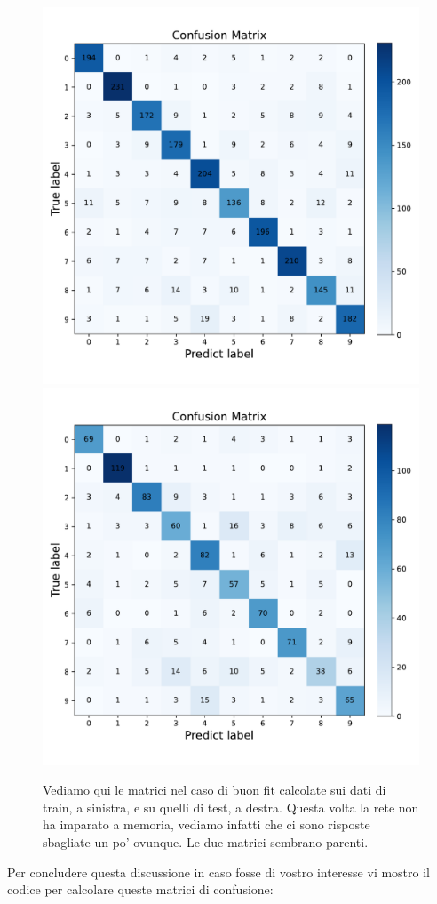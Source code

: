 \documentclass[10pt,a4paper]{article}
\begin{document}
\FloatBarrier
\FloatBarrier
\begin{figure}[h]
\centering
\includegraphics[scale=0.4]{img/conf_mat_fit_train.pdf}
\includegraphics[scale=0.4]{img/conf_mat_fit_test.pdf}
\caption{Vediamo qui le matrici nel caso di buon fit calcolate sui dati di train, a sinistra, e su quelli di test, a destra. Questa volta la rete non ha imparato a memoria, vediamo infatti che ci sono risposte sbagliate un po' ovunque. Le due matrici sembrano parenti.}
\end{figure}
\FloatBarrier
Per concludere questa discussione in caso fosse di vostro interesse vi mostro il codice per calcolare queste matrici di confusione:
\end{document}
